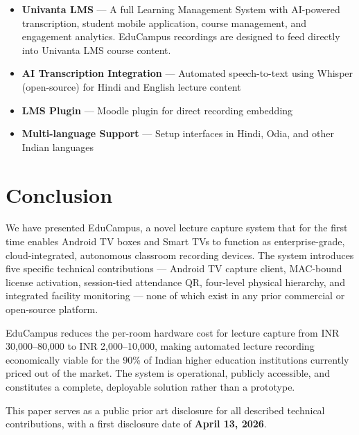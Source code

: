 \documentclass[12pt,a4paper]{article}
\begin{document}
\begin{itemize}
    \item \textbf{Univanta LMS} — A full Learning Management System with AI-powered transcription, student mobile application, course management, and engagement analytics. EduCampus recordings are designed to feed directly into Univanta LMS course content.
    \item \textbf{AI Transcription Integration} — Automated speech-to-text using Whisper (open-source) for Hindi and English lecture content
    \item \textbf{LMS Plugin} — Moodle plugin for direct recording embedding
    \item \textbf{Multi-language Support} — Setup interfaces in Hindi, Odia, and other Indian languages
\end{itemize}

\section{Conclusion}

We have presented EduCampus, a novel lecture capture system that for the first time enables Android TV boxes and Smart TVs to function as enterprise-grade, cloud-integrated, autonomous classroom recording devices. The system introduces five specific technical contributions — Android TV capture client, MAC-bound license activation, session-tied attendance QR, four-level physical hierarchy, and integrated facility monitoring — none of which exist in any prior commercial or open-source platform.

EduCampus reduces the per-room hardware cost for lecture capture from INR 30{,}000--80{,}000 to INR 2{,}000--10{,}000, making automated lecture recording economically viable for the 90\% of Indian higher education institutions currently priced out of the market. The system is operational, publicly accessible, and constitutes a complete, deployable solution rather than a prototype.

This paper serves as a public prior art disclosure for all described technical contributions, with a first disclosure date of \textbf{April 13, 2026}.
\end{document}
